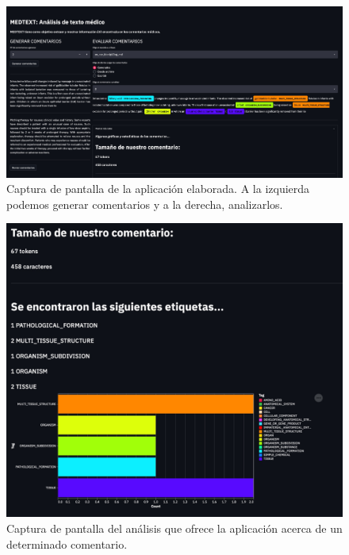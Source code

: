 \begin{figure}[h]
	\centering
	\includegraphics[width=.9\textwidth]{media/app_demo.jpeg}
	\caption{Captura de pantalla de la aplicación elaborada. A la izquierda podemos generar comentarios y a la derecha, analizarlos.}
	\label{fig:app-demo}
\end{figure}


\begin{figure}[h]
	\centering
	\includegraphics[width=.62\textwidth]{media/analysis_comment.jpeg}
	\caption{Captura de pantalla del análisis que ofrece la aplicación acerca de un determinado comentario.}
	\label{fig:analysis-comment}
\end{figure}







